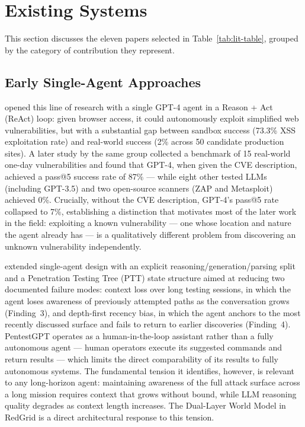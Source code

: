 \section{Existing Systems}
\label{sec_existing_systems}

This section discusses the eleven papers selected in Table~\ref{tab:lit-table}, grouped by the category of contribution they represent.

\subsection{Early Single-Agent Approaches}
\label{subsec_single_agent}

\citet{fang2024hackwebsites} opened this line of research with a single GPT-4 agent in a Reason + Act (ReAct) loop: given browser access, it could autonomously exploit simplified web vulnerabilities, but with a substantial gap between sandbox success (73.3\% XSS exploitation rate) and real-world success (2\% across 50 candidate production sites). A later study by the same group \citep{fang2024oneday} collected a benchmark of 15 real-world one-day vulnerabilities and found that GPT-4, when given the CVE description, achieved a pass@5 success rate of 87\% --- while eight other tested LLMs (including GPT-3.5) and two open-source scanners (ZAP and Metasploit) achieved 0\%. Crucially, without the CVE description, GPT-4's pass@5 rate collapsed to 7\%, establishing a distinction that motivates most of the later work in the field: exploiting a known vulnerability --- one whose location and nature the agent already has --- is a qualitatively different problem from discovering an unknown vulnerability independently.

\citet{deng2024pentestgpt} extended single-agent design with an explicit reasoning/generation/parsing split and a Penetration Testing Tree (PTT) state structure aimed at reducing two documented failure modes: context loss over long testing sessions, in which the agent loses awareness of previously attempted paths as the conversation grows (Finding~3), and depth-first recency bias, in which the agent anchors to the most recently discussed surface and fails to return to earlier discoveries (Finding~4). PentestGPT operates as a human-in-the-loop assistant rather than a fully autonomous agent --- human operators execute its suggested commands and return results --- which limits the direct comparability of its results to fully autonomous systems. The fundamental tension it identifies, however, is relevant to any long-horizon agent: maintaining awareness of the full attack surface across a long mission requires context that grows without bound, while LLM reasoning quality degrades as context length increases. The Dual-Layer World Model in RedGrid is a direct architectural response to this tension.

